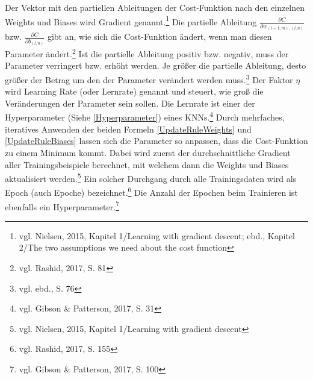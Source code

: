 \documentclass[
	a4paper,
	12pt,
	ngerman,
	oneside
]{scrreprt}											%
\newcommand{\practitioner}[1]{vgl. Gibson \& Patterson, 2017, S. {#1}}
\begin{document}
			Der Vektor mit den partiellen Ableitungen der Cost-Funktion nach den einzelnen Weights und Biases wird Gradient genannt.\footnote{vgl. Nielsen, 2015, Kapitel 1/Learning with gradient descent; ebd., Kapitel 2/The two assumptions we need about the cost function} Die partielle Ableitung $\frac{\partial C}{\partial w_{(l-1,m),(l,n)}}$ bzw. $\frac{\partial C}{\partial b_{(l,n)}}$ gibt an, wie sich die Cost-Funktion ändert, wenn man diesen Parameter ändert.\footnote{vgl. Rashid, 2017, S. 81} Ist die partielle Ableitung positiv bzw. negativ, muss der Parameter verringert bzw. erhöht werden. Je größer die partielle Ableitung, desto größer der Betrag um den der Parameter verändert werden muss.\footnote{vgl. ebd., S. 76} Der Faktor $\eta$ wird Learning Rate (oder Lernrate) genannt und steuert, wie groß die Veränderungen der Parameter sein sollen. Die Lernrate ist einer der Hyperparameter (Siehe \ref{Hyperparameter}) eines KNNs.\footnote{\practitioner{31}} \newline \break 
			Durch mehrfaches, iteratives Anwenden der beiden Formeln \ref{UpdateRuleWeights} und \ref{UpdateRuleBiases} lassen sich die Parameter so anpassen, dass die Cost-Funktion zu einem Minimum kommt. Dabei wird zuerst der durchschnittliche Gradient aller Trainingsbeispiele berechnet, mit welchem dann die Weights und Biases aktualisiert werden.\footnote{vgl. Nielsen, 2015, Kapitel 1/Learning with gradient descent} Ein solcher Durchgang durch alle Trainingsdaten wird als Epoch (auch Epoche) bezeichnet.\footnote{vgl. Rashid, 2017, S. 155} Die Anzahl der Epochen beim Trainieren ist ebenfalls ein Hyperparameter.\footnote{\practitioner{100}}

			\enlargethispage{0.3\baselineskip}
	
\end{document}
